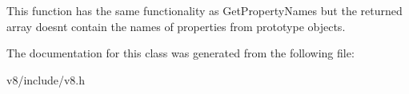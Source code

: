 This function has the same functionality as Get\+Property\+Names but the returned array doesn\textquotesingle{}t contain the names of properties from prototype objects. 

The documentation for this class was generated from the following file\+:\begin{DoxyCompactItemize}
\item 
v8/include/v8.\+h\end{DoxyCompactItemize}
